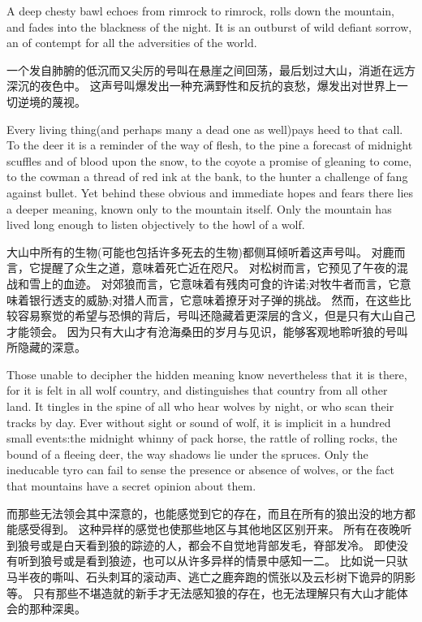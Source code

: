 \documentclass[cs4size, a4paper, 12pt]{article}
\newcounter{numpar}
\newcommand*{\newpar}{\numpar{}}
\begin{document}
	\newpar A deep chesty bawl echoes from rimrock to rimrock, rolls down the mountain, and fades into the blackness of the night. It is an outburst of wild defiant sorrow, an of contempt for all the adversities of the world.
	
	一个发自肺腑的低沉而又尖厉的号叫在悬崖之间回荡，最后划过大山，消逝在远方深沉的夜色中。 这声号叫爆发出一种充满野性和反抗的哀愁，爆发出对世界上一切逆境的蔑视。 
	
	\newpar Every living thing(and perhaps many a dead one as well)pays heed to that call. To the deer it is a reminder of the way of flesh, to the pine a forecast of midnight scuffles and of blood upon the snow, to the coyote a promise of gleaning to come, to the cowman a thread of red ink at the bank, to the hunter a challenge of fang against bullet. Yet behind these obvious and immediate hopes and fears there lies a deeper meaning, known only to the mountain itself. Only the mountain has lived long enough to listen objectively to the howl of a wolf.
	
	大山中所有的生物(可能也包括许多死去的生物)都侧耳倾听着这声号叫。 对鹿而言，它提醒了众生之道，意味着死亡近在咫尺。 对松树而言，它预见了午夜的混战和雪上的血迹。 对郊狼而言，它意味着有残肉可食的许诺;对牧牛者而言，它意味着银行透支的威胁;对猎人而言，它意味着撩牙对子弹的挑战。 然而，在这些比较容易察觉的希望与恐惧的背后，号叫还隐藏着更深层的含义，但是只有大山自己才能领会。 因为只有大山才有沧海桑田的岁月与见识，能够客观地聆听狼的号叫所隐藏的深意。 
	
	\newpar Those unable to decipher the hidden meaning know nevertheless that it is there, for it is felt in all wolf country, and distinguishes that country from all other land. It tingles in the spine of all who hear wolves by night, or who scan their tracks by day. Ever without sight or sound of wolf, it is implicit in a hundred small events:the midnight whinny of pack horse, the rattle of rolling rocks, the bound of a fleeing deer, the way shadows lie under the spruces. Only the ineducable tyro can fail to sense the presence or absence of wolves, or the fact that mountains have a secret opinion about them. 
	
	而那些无法领会其中深意的，也能感觉到它的存在，而且在所有的狼出没的地方都能感受得到。 这种异样的感觉也使那些地区与其他地区区别开来。 所有在夜晚听到狼号或是白天看到狼的踪迹的人，都会不自觉地背部发毛，脊部发冷。 即使没有听到狼号或是看到狼迹，也可以从许多异样的情景中感知一二。 比如说一只驮马半夜的嘶叫、石头刺耳的滚动声、逃亡之鹿奔跑的慌张以及云杉树下诡异的阴影等。 只有那些不堪造就的新手才无法感知狼的存在，也无法理解只有大山才能体会的那种深奥。 
	
\end{document}
